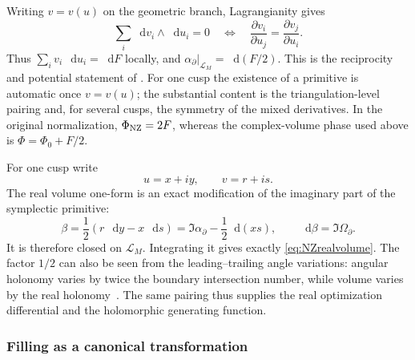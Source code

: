 \documentclass[11pt,a4paper]{article}
\numberwithin{equation}{section}
\theoremstyle{definition}
\theoremstyle{remark}
\newcommand{\dd}{\mathop{}\!\mathrm d}
\begin{document}
Writing $v=v(u)$ on the geometric branch, Lagrangianity gives
\begin{equation}
 \sum_i\dd v_i\wedge\dd u_i=0
 \quad\Longleftrightarrow\quad
 \frac{\partial v_i}{\partial u_j}
       =\frac{\partial v_j}{\partial u_i}.
 \label{eq:NZreciprocity}
\end{equation}
Thus $\sum_i v_i\,\dd u_i=\dd F$ locally, and
$\alpha_\partial|_{\mathcal L_M}=\dd(F/2)$.
This is the reciprocity and potential statement of
\cite[Theorem 3]{NeumannZagier}. For one cusp the existence of a
primitive is automatic once $v=v(u)$; the substantial content is
the triangulation-level pairing and, for several cusps, the
symmetry of the mixed derivatives. In the original normalization,
$\Phi_{\rm NZ}=2F$, whereas the complex-volume phase used above is
$\Phi=\Phi_0+F/2$.

For one cusp write
\[
 u=x+iy,\qquad v=r+is.
\]
The real volume one-form is an exact modification of the imaginary
part of the symplectic primitive:
\begin{equation}
 \beta=\frac12(r\,\dd y-x\,\dd s)
       =\Im\alpha_\partial-\frac12\dd(xs),\qquad
 \dd\beta=\Im\Omega_\partial.
 \label{eq:NZvolumeprimitive}
\end{equation}
It is therefore closed on $\mathcal L_M$. Integrating it gives exactly
\eqref{eq:NZrealvolume}. The factor $1/2$ can also be seen from
the leading--trailing angle variations: angular holonomy varies by
twice the boundary intersection number, while volume varies by the
real holonomy~\cite[Lemma 4.4 and Proposition 5.4]{FuterGueritaud}.
The same pairing thus supplies the real optimization differential
and the holomorphic generating function.

\subsubsection{Filling as a canonical transformation}
\end{document}
